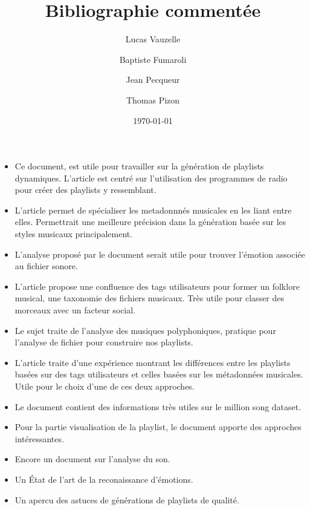 \documentclass{article}
\title{Bibliographie commentée}
\author{Lucas Vauzelle \and Baptiste Fumaroli \and Jean Pecqueur \and Thomas Pizon}
\date{\today}
\begin{document}
\maketitle

\begin{itemize}

\item Ce document\cite{ref1}, est utile pour travailler sur la génération de
playlists dynamiques. L'article est centré sur l'utilisation des programmes de
radio pour créer des playlists y ressemblant.

\item L'article\cite{ref2} permet de spécialiser les metadonnnés musicales en
les liant entre elles. Permettrait une meilleure précision dans la génération
basée sur les styles musicaux principalement.

\item L'analyse proposé par le document\cite{ref3} serait utile pour trouver
l'émotion associée au fichier sonore.

\item L'article\cite{ref4} propose une confluence des tags utilisateurs pour
former un folklore musical, une taxonomie des fichiers musicaux. Très utile pour
classer des morceaux avec un facteur social.

\item Le sujet\cite{ref5} traite de l'analyse des musiques polyphoniques,
pratique pour l'analyse de fichier pour construire nos playlists.

\item L'article\cite{ref6} traite d'une expérience montrant les différences
entre les playlists basées sur des tags utilisateurs et celles basées sur les
métadonnées musicales. Utile pour le choix d'une de ces deux approches.

\item Le document\cite{ref7} contient des informations très utiles sur le million
song dataset.

\item Pour la partie visualisation de la playlist, le document\cite{ref8}
apporte des approches intéressantes.

\item Encore un document\cite{ref9} sur l'analyse du son.

\item Un État de l'art de la reconaissance d'émotions\cite{ref10}.

\item Un apercu des astuces de générations de playlists de qualité\cite{ref11}.

\end{itemize}



\end{document}
